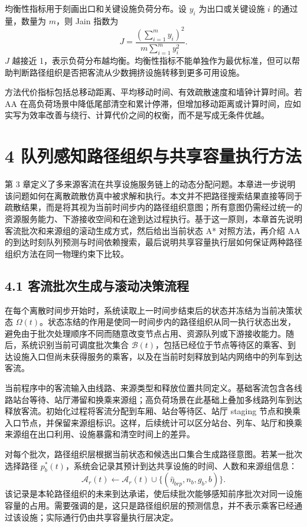 \documentclass[UTF8,a4paper,12pt]{ctexart}
\begin{document}
均衡性指标用于刻画出口和关键设施负荷分布。设 \(y_i\) 为出口或关键设施 \(i\) 的通过量，数量为 \(m\)，则 Jain 指数为
\[
J=\frac{(\sum_{i=1}^{m}y_i)^2}{m\sum_{i=1}^{m}y_i^2}.
\]
\(J\) 越接近 1，表示负荷分布越均衡。均衡性指标不能单独作为最优标准，但可以帮助判断路径组织是否把客流从少数拥挤设施转移到更多可用设施。

方法代价指标包括总移动距离、平均移动时间、有效疏散速度和墙钟计算时间。若 AA 在高负荷场景中降低尾部清空和累计停滞，但增加移动距离或计算时间，应如实写为效率改善与绕行、计算代价之间的权衡，而不是写成无条件优越。

\section{4 队列感知路径组织与共享容量执行方法}

第 3 章定义了多来源客流在共享设施服务链上的动态分配问题。本章进一步说明该问题如何在离散疏散仿真中被求解和执行。本文并不把路径搜索结果直接等同于疏散结果，而是将其视为当前时间步内的路径组织意图；所有意图仍需经过统一的资源服务能力、下游接收空间和在途到达过程执行。基于这一原则，本章首先说明客流批次和来源组的滚动生成方式，然后给出当前状态 A* 对照方法，再介绍 AA 的到达时刻队列预测与时间依赖搜索，最后说明共享容量执行层如何保证两种路径组织方法在同一物理约束下比较。

\subsection{4.1 客流批次生成与滚动决策流程}

在每个离散时间步开始时，系统读取上一时间步结束后的状态并冻结为当前决策状态 \(\Omega(t)\)。状态冻结的作用是使同一时间步内的路径组织从同一执行状态出发，避免由于批次处理顺序不同而随意改变节点占用、资源队列或下游接收能力。随后，系统识别当前可调度批次集合 \(\mathcal B(t)\)，包括已经位于节点等待区的乘客、到达设施入口但尚未获得服务的乘客，以及在当前时刻释放到站内网络中的列车到达客流。

当前程序中的客流输入由线路、来源类型和释放位置共同定义。基础客流包含各线路站台等待、站厅滞留和换乘来源组；高负荷场景在此基础上叠加多线路列车到达释放客流。初始化过程将客流分配到车厢、站台等待区、站厅 staging 节点和换乘入口节点，并保留来源组标识。这样，后续统计可以区分站台、列车、站厅和换乘来源组在出口利用、设施暴露和清空时间上的差异。

对每个批次，路径组织层根据当前状态和候选出口集合生成路径意图。若某一批次选择路径 \(p_b^{*}(t)\)，系统会记录其预计到达共享设施的时间、人数和来源组信息：
\[
\mathcal A_r(t)\leftarrow
\mathcal A_r(t)\cup\{(\widehat\eta_{brp},n_b,g_b,b)\}.
\]
该记录是本轮路径组织的未来到达承诺，使后续批次能够感知前序批次对同一设施容量的占用。需要强调的是，这只是路径组织层的预测信息，并不表示乘客已经通过该设施；实际通行仍由共享容量执行层决定。
\end{document}
